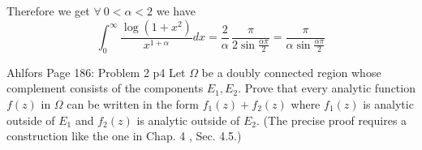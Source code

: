 \documentclass[a4paper, 11pt]{article}
\begin{document}
{\begin{enumerate}[label=(\alph*)]
Therefore we get $\forall\ 0<\alpha <2$ we have $$	\int_0^{\infty} \frac{\log \left(1+x^2\right)}{x^{1+\alpha}} d x=\frac{2}{\alpha} \, \frac{\pi}{2\sin \frac{\alpha \pi}{2}}=\frac{\pi}{\alpha\sin \frac{\alpha \pi}{2}}$$

		\end{enumerate}	}
	



	

	
	\begin{problem}{%
			Ahlfors Page 186: Problem 2
		}{p4%
		}
Let $\Omega$ be a doubly connected region whose complement consists of the components $E_1, E_2$. Prove that every analytic function $f(z)$ in $\Omega$ can be written in the form $f_1(z)+f_2(z)$ where $f_1(z)$ is analytic outside of $E_1$ and $f_2(z)$ is analytic outside of $E_2$. (The precise proof requires a construction like the one in Chap. 4 , Sec. 4.5.)	\end{problem}
	
\end{document}
